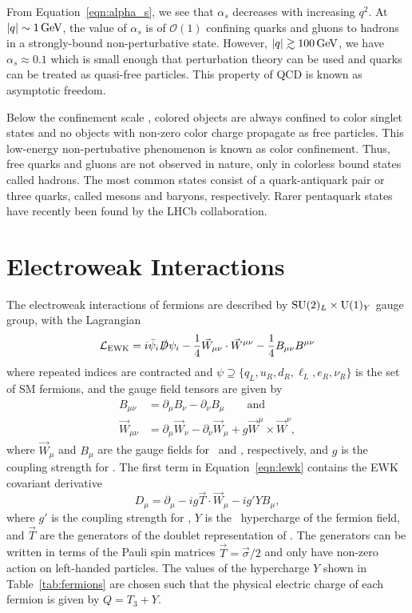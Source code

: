 From Equation~\ref{eqn:alpha_s}, we see that $\alpha_s$ decreases with increasing $q^2$.
At $\lvert q \rvert \sim 1\,\text{Ge\hspace{-.08em}V}$, the value of $\alpha_s$ is of $\mathcal{O}(1)$ confining quarks and gluons to hadrons in a strongly-bound non-perturbative state.
However, $\lvert q \rvert \gtrsim 100\,\text{Ge\hspace{-.08em}V}$, we have $\alpha_s \approx 0.1$ which is small enough that perturbation theory can be used and quarks can be treated as quasi-free particles.
This property of QCD is known as asymptotic freedom.

Below the confinement scale \lqcd, colored objects are always confined to color singlet states and no objects with non-zero color charge propagate as free particles.
This low-energy non-pertubative phenomenon is known as color confinement.
Thus, free quarks and gluons are not observed in nature, only in colorless bound states called hadrons.
The most common states consist of a quark-antiquark pair or three quarks, called mesons and baryons, respectively.
Rarer pentaquark states have recently been found by the LHCb collaboration.

\section{Electroweak Interactions}
\label{sec:ewk}

The electroweak interactions of fermions are described by $\text{SU}(2)_L \times \text{U}(1)_Y$ gauge group, with the Lagrangian
\begin{equation}
  \label{eqn:lewk}
  \mathcal{L}_{\text{EWK}} = i \bar \psi_i \slashed D \psi_i - \frac{1}{4} \vec W_{\mu\nu} \cdot \vec W^{\mu\nu} - \frac{1}{4} B_{\mu\nu} B^{\mu\nu}
\end{equation}
where repeated indices are contracted and $\psi \supseteq \{q_L, u_R, d_R, \ell_L, e_R, \nu_R\}$ is the set of SM fermions, and the gauge field tensors are given by
\begin{align}
  B_{\mu\nu} & = \partial_\mu B_\nu - \partial_\nu B_\mu \qquad \text{and} \nonumber \\
  \vec W_{\mu\nu} & = \partial_\mu \vec W_\nu - \partial_\nu \vec W_\mu + g \vec W^\mu \times \vec W^\nu ,
\end{align}
where $\vec W_\mu$ and $B_\mu$ are the gauge fields for \sutwo\ and \uone, respectively, and $g$ is the coupling strength for \sutwo.
The first term in Equation~\ref{eqn:lewk} contains the EWK covariant derivative
\begin{equation}
  D_{\mu} = \partial_\mu - i g \vec T \cdot \vec W_\mu - i g' Y B_\mu,
\end{equation}
where $g'$ is the coupling strength for \uone,
$Y$ is the \uone\ hypercharge of the fermion field,
and $\vec T$ are the generators of the doublet representation of \sutwo.
The generators can be written in terms of the Pauli spin matrices $\vec T = \vec \sigma / 2$ and only have non-zero action on left-handed particles. 
The values of the hypercharge $Y$ shown in Table~\ref{tab:fermions} are chosen such that the physical electric charge of each fermion is given by $Q =  T_3 + Y$.


